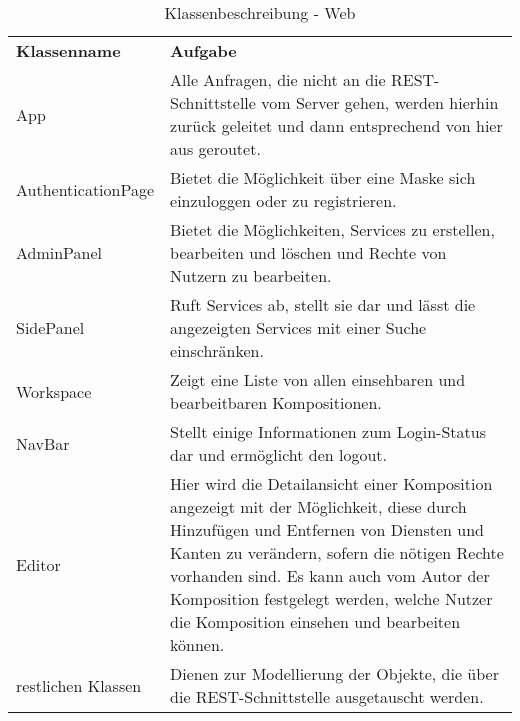 \begin{table}[h]
	\centering
	\begin{tabularx}{\textwidth}{X X}
		\rowcolor[HTML]{C0C0C0} 
		\textbf{Klassenname} & \textbf{Aufgabe} \\
		App & Alle Anfragen, die nicht an die REST-Schnittstelle vom Server gehen, werden hierhin zurück geleitet
		und dann entsprechend von hier aus geroutet. \\
		\rowcolor[HTML]{E7E7E7} 
		AuthenticationPage & Bietet die Möglichkeit über eine Maske sich einzuloggen oder zu registrieren. \\
		AdminPanel & Bietet die Möglichkeiten, Services zu erstellen, bearbeiten und löschen und Rechte von Nutzern zu bearbeiten. \\
		\rowcolor[HTML]{E7E7E7} 
		SidePanel & Ruft Services ab, stellt sie dar und lässt die angezeigten Services mit einer Suche einschränken. \\
		Workspace & Zeigt eine Liste von allen einsehbaren und bearbeitbaren Kompositionen. \\
		\rowcolor[HTML]{E7E7E7} 
		NavBar & Stellt einige Informationen zum Login-Status dar und ermöglicht den logout. \\
		Editor & Hier wird die Detailansicht einer Komposition angezeigt mit der Möglichkeit, diese durch Hinzufügen und Entfernen von
		Diensten und Kanten zu verändern, sofern die nötigen Rechte vorhanden sind. Es kann auch vom Autor der Komposition festgelegt
		werden, welche Nutzer die Komposition einsehen und bearbeiten können. \\
		\rowcolor[HTML]{E7E7E7} 
		restlichen Klassen & Dienen zur Modellierung der Objekte, die über die REST-Schnittstelle ausgetauscht werden. 
	\end{tabularx}
	\caption{Klassenbeschreibung - Web}
	\label{table:klassenbeschreibung-web}
\end{table}
